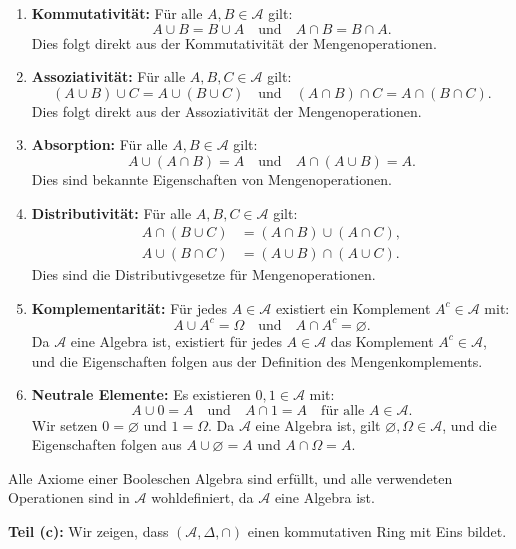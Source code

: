\documentclass{article}
\newcommand{\Om}{\Omega}
\renewcommand{\AA}{\mathcal{A}}
\theoremstyle{definition}
\begin{document}
\begin{enumerate}
    \item \textbf{Kommutativität:} Für alle $A, B \in \AA$ gilt:
    \[
    A \cup B = B \cup A \quad \text{und} \quad A \cap B = B \cap A.
    \]
    Dies folgt direkt aus der Kommutativität der Mengenoperationen.
    
    \item \textbf{Assoziativität:} Für alle $A, B, C \in \AA$ gilt:
    \[
    (A \cup B) \cup C = A \cup (B \cup C) \quad \text{und} \quad (A \cap B) \cap C = A \cap (B \cap C).
    \]
    Dies folgt direkt aus der Assoziativität der Mengenoperationen.
    
    \item \textbf{Absorption:} Für alle $A, B \in \AA$ gilt:
    \[
    A \cup (A \cap B) = A \quad \text{und} \quad A \cap (A \cup B) = A.
    \]
    Dies sind bekannte Eigenschaften von Mengenoperationen.
    
    \item \textbf{Distributivität:} Für alle $A, B, C \in \AA$ gilt:
    \begin{align}
    A \cap (B \cup C) &= (A \cap B) \cup (A \cap C),\\
    A \cup (B \cap C) &= (A \cup B) \cap (A \cup C).
    \end{align}
    Dies sind die Distributivgesetze für Mengenoperationen.
    
    \item \textbf{Komplementarität:} Für jedes $A \in \AA$ existiert ein Komplement $A^c \in \AA$ mit:
    \[
    A \cup A^c = \Om \quad \text{und} \quad A \cap A^c = \varnothing.
    \]
    Da $\AA$ eine Algebra ist, existiert für jedes $A \in \AA$ das Komplement $A^c \in \AA$, und die Eigenschaften folgen aus der Definition des Mengenkomplements.
    
    \item \textbf{Neutrale Elemente:} Es existieren $0, 1 \in \AA$ mit:
    \[
    A \cup 0 = A \quad \text{und} \quad A \cap 1 = A \quad \text{für alle } A \in \AA.
    \]
    Wir setzen $0 = \varnothing$ und $1 = \Om$. Da $\AA$ eine Algebra ist, gilt $\varnothing, \Om \in \AA$, und die Eigenschaften folgen aus $A \cup \varnothing = A$ und $A \cap \Om = A$.
\end{enumerate}

Alle Axiome einer Booleschen Algebra sind erfüllt, und alle verwendeten Operationen sind in $\AA$ wohldefiniert, da $\AA$ eine Algebra ist.

\textbf{Teil (c):} Wir zeigen, dass $(\AA, \Delta, \cap)$ einen kommutativen Ring mit Eins bildet.
\end{document}
